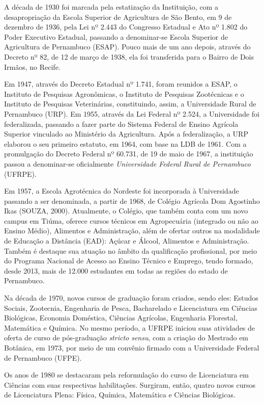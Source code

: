 \documentclass[
	12pt,				%
	openright,			%
  oneside,     %
	a4paper,			%
	english,			%
	french,				%
	spanish,			%
	brazil				%
	]{abntex2}
\begin{document}
A década de 1930 foi marcada pela estatização da Instituição, com a desapropriação da Escola Superior de Agricultura de São Bento, em 9 de dezembro de 1936, pela Lei nº 2.443 do Congresso Estadual e Ato nº 1.802 do Poder Executivo Estadual, passando a denominar-se Escola Superior de Agricultura de Pernambuco (ESAP). Pouco mais de um ano depois, através do Decreto nº 82, de 12 de março de 1938, ela foi transferida para o Bairro de Dois Irmãos, no Recife.

Em 1947, através do Decreto Estadual nº 1.741, foram reunidos a ESAP, o Instituto de Pesquisas Agronômicas, o Instituto de Pesquisas Zootécnicas e o Instituto de Pesquisas Veterinárias, constituindo, assim, a Universidade Rural de Pernambuco (URP). Em 1955, através da Lei Federal nº 2.524, a Universidade foi federalizada, passando a fazer parte do Sistema Federal de Ensino Agrícola Superior vinculado ao Ministério da Agricultura. Após a federalização, a URP elaborou o seu primeiro estatuto, em 1964, com base na LDB de 1961. Com a promulgação do Decreto Federal nº 60.731, de 19 de maio de 1967, a instituição passou a denominar-se oficialmente \textit{Universidade Federal Rural de Pernambuco} (UFRPE).

Em 1957, a Escola Agrotécnica do Nordeste foi incorporada à Universidade passando a ser denominada, a partir de 1968, de Colégio Agrícola Dom Agostinho Ikas (SOUZA, 2000). Atualmente, o Colégio, que também conta com um novo campus em Tiúma, oferece cursos técnicos em Agropecuária (integrado ou não ao Ensino Médio), Alimentos e Administração, além de ofertar outros na modalidade de Educação a Distância (EAD): Açúcar e Álcool, Alimentos e Administração. Também é destaque sua atuação no âmbito da qualificação profissional, por meio do Programa Nacional de Acesso ao Ensino Técnico e Emprego, tendo formado, desde 2013, mais de 12.000 estudantes em todas as regiões do estado de Pernambuco.

Na década de 1970, novos cursos de graduação foram criados, sendo eles: Estudos Sociais, Zootecnia, Engenharia de Pesca, Bacharelado e Licenciatura em Ciências Biológicas, Economia Doméstica, Ciências Agrícolas, Engenharia Florestal, Matemática e Química. No mesmo período, a UFRPE iniciou suas atividades de oferta de curso de pós-graduação \textit{stricto sensu}, com a criação do Mestrado em Botânica, em 1973, por meio de um convênio firmado com a Universidade Federal de Pernambuco (UFPE).

Os anos de 1980 se destacaram pela reformulação do curso de Licenciatura em Ciências com suas respectivas habilitações. Surgiram, então, quatro novos cursos de Licenciatura Plena: Física, Química, Matemática e Ciências Biológicas.
\end{document}
